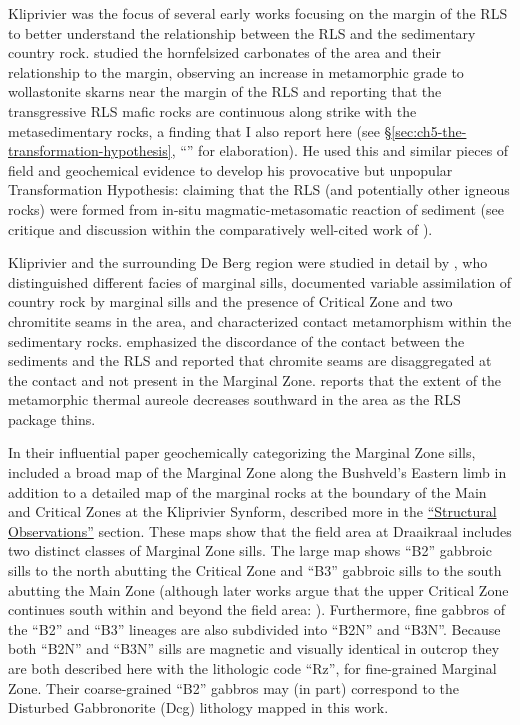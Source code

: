 Kliprivier was the focus of several early works focusing on the margin
of the RLS to better understand the relationship between the RLS and the
sedimentary country rock. \citet{vanbiljon1949} studied the hornfelsized
carbonates of the area and their relationship to the margin, observing
an increase in metamorphic grade to wollastonite skarns near the margin
of the RLS and reporting that the transgressive RLS mafic rocks are
continuous along strike with the metasedimentary rocks, a finding that I
also report here (see \S\ref{sec:ch5-the-transformation-hypothesis}, ``'' for elaboration). He used
this and similar pieces of field and geochemical evidence to develop his
provocative but unpopular Transformation Hypothesis: claiming that the
RLS (and potentially other igneous rocks) were formed from in-situ
magmatic-metasomatic reaction of sediment (see critique and discussion within
the comparatively well-cited work of \citealp{cousins1959}).

Kliprivier and the surrounding De Berg region were studied in detail by
\citet{frick1967}, who distinguished different facies of marginal sills,
documented variable assimilation of country rock by marginal sills and
the presence of Critical Zone and two chromitite seams in the area, and
characterized contact metamorphism within the sedimentary rocks. \citet{frick1967}
emphasized the discordance of the contact between the sediments
and the RLS and reported that chromite seams are disaggregated at the
contact and not present in the Marginal Zone. \citet{button1976} reports that
the extent of the metamorphic thermal aureole decreases southward in the
area as the RLS package thins.

In their influential paper geochemically categorizing the Marginal Zone
sills, \citet{harmer1985} included a broad map of the Marginal
Zone along the Bushveld's Eastern limb in addition to a detailed map of
the marginal rocks at the boundary of the Main and Critical Zones at the
Kliprivier Synform, described more in the \hyperref[sec:ch5-structural-observations]{``Structural Observations''}
section. These maps show that the field area at Draaikraal includes two
distinct classes of Marginal Zone sills. The large map shows ``B2''
gabbroic sills to the north abutting the Critical Zone and ``B3''
gabbroic sills to the south abutting the Main Zone (although later works
argue that the upper Critical Zone continues south within and beyond the
field area: \citealp{vandermerwe2007,latypovetal2022}). Furthermore,
fine gabbros of the ``B2'' and ``B3'' lineages are also subdivided into
``B2N'' and ``B3N''. Because both ``B2N'' and ``B3N'' sills are magnetic
and visually identical in outcrop they are both described here with the
lithologic code ``Rz'', for fine-grained Marginal Zone. Their
coarse-grained ``B2'' gabbros may (in part) correspond to the Disturbed
Gabbronorite (Dcg) lithology mapped in this work.

